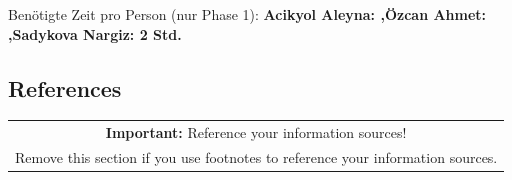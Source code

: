 \documentclass[11pt]{scrartcl}
\begin{document}
Benötigte Zeit pro Person (nur Phase 1): \textbf{Acikyol Aleyna: ,Özcan Ahmet: ,Sadykova Nargiz: 2 Std.}

\subsection*{References}

\begin{table}[H]
  \centering
  \begin{tabular}{c}
    \hline
    \textbf{Important:} Reference your information sources! \tabularnewline
    Remove this section if you use footnotes to reference your information sources. \tabularnewline
    \hline
  \end{tabular}
\end{table}
\end{document}
